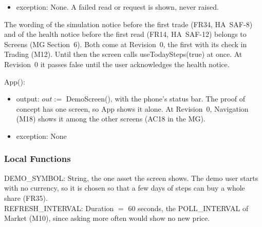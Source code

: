\documentclass[12pt, titlepage]{article}
\begin{document}
\begin{itemize}
\begin{enumerate}
  \item The portfolio value, portfolio.holdings\_value, with ``Simulated''
    next to it (FR43, HA~SAF-10), and the price it was valued at with its
    time and ``Delayed'' marker (FR33). Each new portfolio reply shows it at
    the latest price the server has (FR32, FR42). The reply has no gain or
    loss yet. At Revision~0 one is shown with its sign or a word, never by
    colour alone (FR44, HA~H50).
  \item message, so a failed request, such as a server that can't be reached
    or too little currency, is told in words and never crashes the screen
    (NFR2).
  \end{enumerate}
  Each amount is shown from the server's text, never as a floating-point
  number, which can't hold most decimals exactly (NFR1). Showing it to two
  decimals keeps it within VALUE\_TOLERANCE (SEC-30). Every text and control
  grows with textScale up to MAX\_TEXT\_SCALE, 200\% (SRS Appendix~C),
  without being clipped, and the screen scrolls (NFR8). No text is shrunk to
  fit, which would undo the user's text size.
\item exception: None. A failed read or request is shown, never raised.
\end{itemize}

\noindent The wording of the simulation notice before the first trade (FR34,
HA~SAF-8) and of the health notice before the first read (FR14, HA~SAF-12)
belongs to Screens (MG Section~6). Both come at Revision~0, the first with
its check in Trading (M12). Until then the screen calls useTodaySteps(true)
at once. At Revision~0 it passes false until the user acknowledges the health
notice.

\medskip
\noindent App():
\begin{itemize}
\item output: $out :=$ DemoScreen(), with the phone's status bar. The proof of
  concept has one screen, so App shows it alone. At Revision~0, Navigation
  (M18) shows it among the other screens (AC18 in the MG).
\item exception: None
\end{itemize}

\subsubsection{Local Functions}

\noindent DEMO\_SYMBOL: String, the one asset the screen shows. The demo user
starts with no currency, so it is chosen so that a few days of steps can buy a
whole share (FR35).\\
REFRESH\_INTERVAL: Duration $=$ 60 seconds, the POLL\_INTERVAL of Market
(M10), since asking more often would show no new price.
\end{document}
